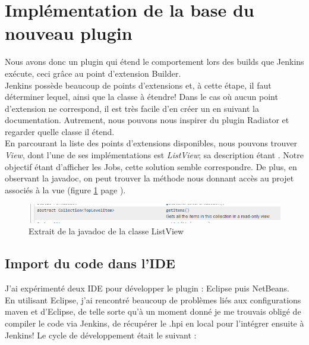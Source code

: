 \section{Implémentation de la base du nouveau plugin}

Nous avons donc un plugin qui étend le comportement lors des builds que Jenkins exécute, ceci grâce au point d'extension Builder.\\
Jenkins possède beaucoup de points d'extensions et, à cette étape, il faut déterminer lequel, ainsi que la classe à étendre! Dans le cas où aucun point d'extension ne correspond, il est très facile d'en créer un en suivant la documentation. Autrement, nous pouvons nous inspirer du plugin Radiator et regarder quelle classe il étend.\\
En parcourant la liste des points d'extensions disponibles, nous pouvons trouver \emph{View}, dont l'une de ses implémentations est \emph{ListView}; sa description étant . Notre objectif étant d'afficher les Jobs, cette solution semble correspondre. De plus, en observant la javadoc, on peut trouver la méthode nous donnant accès au projet associés à la vue (figure \ref{figure:listviewJavaDoc} page \pageref{figure:listviewJavaDoc}).

\begin{figure}[!h]
  \centering
      \includegraphics[width=\textwidth]{images/listviewJavaDoc.png}
  \caption{Extrait de la javadoc de la classe ListView}
	\label{figure:listviewJavaDoc}
\end{figure}



\subsection{Import du code dans l'IDE}
J'ai expérimenté deux IDE pour développer le plugin : Eclipse puis NetBeans.\\
En utilisant Eclipse, j'ai rencontré beaucoup de problèmes liés aux configurations maven et d'Eclipse, de telle sorte qu'à un moment donné je me trouvais obligé de compiler le code via Jenkins, de récupérer le .hpi en local pour l'intégrer ensuite à Jenkins!
Le cycle de développement était le suivant :

